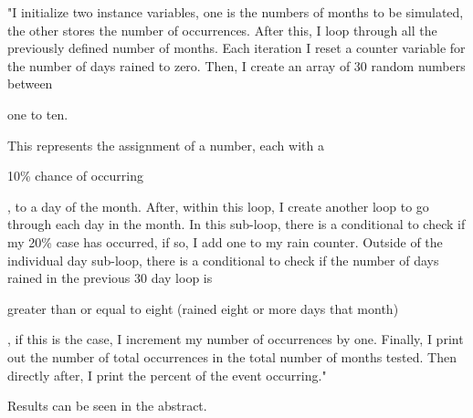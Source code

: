 \documentclass[twocolumn]{revtex4}
\begin{document}
"I initialize two instance variables, one is the numbers of months to be simulated, the other stores the number of occurrences. After this, I loop through all the previously defined number of months. Each iteration I reset a counter variable for the number of days rained to zero. Then, I create an array of 30 random numbers between \begin{bf}one to ten.\end{bf} This represents the assignment of a number, each with a \begin{bf}10\% chance of occurring\end{bf}, to a day of the month. After, within this loop, I create another loop to go through each day in the month. In this sub-loop, there is a conditional to check if my 20\% case has occurred, if so, I add one to my rain counter. Outside of the individual day sub-loop, there is a conditional to check if the number of days rained in the previous 30 day loop is\begin{bf} greater than or equal to eight (rained eight or more days that month)\end{bf}, if this is the case, I increment my number of occurrences by one. Finally, I print out the number of total occurrences in the total number of months tested. Then directly after, I print the percent of the event occurring."\newline

\begin{it}Results can be seen in the abstract.
\end{it}
\end{document}
